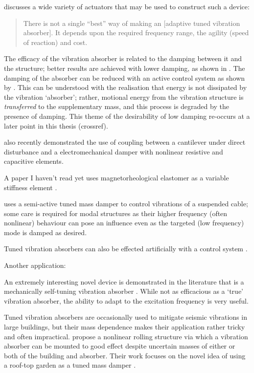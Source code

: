 \textcite{brennan2006} discusses a wide variety of actuators that may
be used to construct such a device:
\begin{quote}
  There is not a single ``best'' way of making an [adaptive tuned
  vibration absorber]. It depends upon the required frequency range,
  the agility (speed of reaction) and cost.
\end{quote}

The efficacy of the vibration absorber is related to the damping between it
and the structure; better results are achieved with lower damping, as shown in
. The damping of the absorber can be reduced with an
active control system as shown by \textcite{kidner1998}. This can be
understood with the realisation that energy is not dissipated by the vibration
`absorber'; rather, motional energy from the vibration structure is
\emph{transferred} to the supplementary mass, and this process is degraded by
the presence of damping. This theme of the desirability of low damping
re-occurs at a later point in this thesis (crossref).

\textcite{felix2008} also recently demonstrated the use of coupling between a
cantilever under direct disturbance and a electromechanical damper with
nonlinear resistive and capacitive elements.

A paper I haven't read yet uses magnetorheological elastomer as a variable
stiffness element \cite{holdhusen2007}.

\textcite{casciati2007} uses a semi-active tuned mass damper to
control vibrations of a suspended cable; some care is required for
modal structures as their higher frequency (often nonlinear) behaviour
can pose an influence even as the targeted (low frequency) mode is
damped as desired.

Tuned vibration absorbers can also be effected artificially with a control
system \cite{kim2008a}.

Another application: \cite{moradi2008}

An extremely interesting novel device is demonstrated in the literature that
is a mechanically self-tuning vibration absorber \cite{ivers2008}. While not
as efficacious as a `true' vibration absorber, the ability to adapt to the
excitation frequency is very useful.

Tuned vibration absorbers are occasionally used to mitigate seismic vibrations
in large buildings, but their mass dependence makes their application rather
tricky and often impractical. \textcite{matta2008} propose a nonlinear
rolling structure via which a vibration absorber can be mounted to good effect
despite uncertain masses of either or both of the building and absorber. Their
work focuses on the novel idea of using a roof-top garden as a tuned mass
damper \parencite{matta2008a}.


